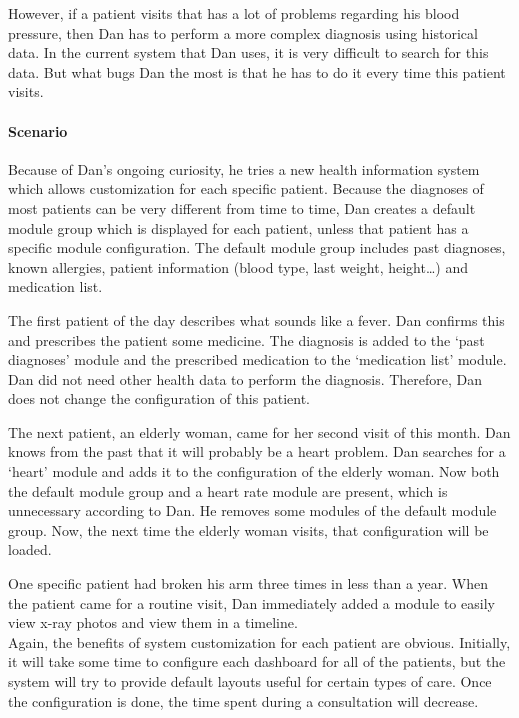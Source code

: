         However, if a patient visits that has a lot of problems regarding his blood pressure, then Dan has to perform a more complex diagnosis using historical data. In the current system that Dan uses, it is very difficult to search for this data. But what bugs Dan the most is that he has to do it every time this patient visits.

        \paragraph{Scenario} Because of Dan's ongoing curiosity, he tries a new health information system which allows customization for each specific patient. Because the diagnoses of most patients can be very different from time to time, Dan creates a default module group which is displayed for each patient, unless that patient has a specific module configuration. The default module group includes past diagnoses, known allergies, patient information (blood type, last weight, height\ldots) and medication list.

        The first patient of the day describes what sounds like a fever. Dan confirms this and prescribes the patient some medicine. The diagnosis is added to the `past diagnoses' module and the prescribed medication to the `medication list' module. Dan did not need other health data to perform the diagnosis. Therefore, Dan does not change the configuration of this patient.

        The next patient, an elderly woman, came for her second visit of this month. Dan knows from the past that it will probably be a heart problem. Dan searches for a `heart' module and adds it to the configuration of the elderly woman. Now both the default module group and a heart rate module are present, which is unnecessary according to Dan. He removes some modules of the default module group. Now, the next time the elderly woman visits, that configuration will be loaded.

        One specific patient had broken his arm three times in less than a year. When the patient came for a routine visit, Dan immediately added a module to easily view x-ray photos and view them in a timeline.\\

        \noindent Again, the benefits of system customization for each patient are obvious. Initially, it will take some time to configure each dashboard for all of the patients, but the system will try to provide default layouts useful for certain types of care. Once the configuration is done, the time spent during a consultation will decrease.
        
